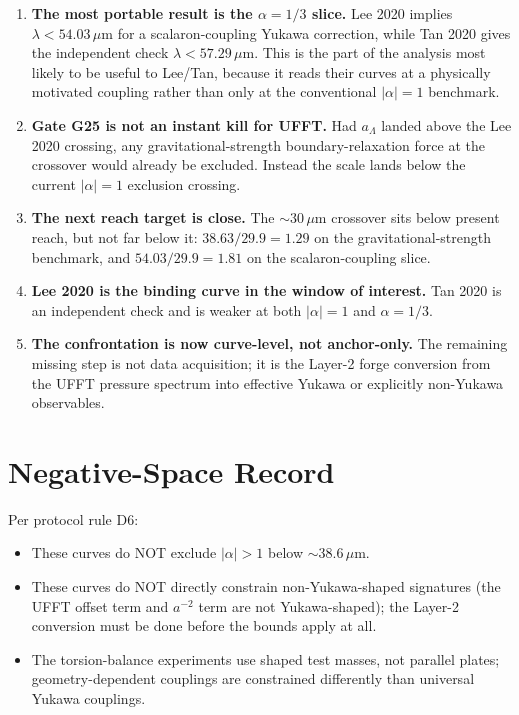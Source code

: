 \documentclass{article}
\begin{document}
\begin{enumerate}
\item \textbf{The most portable result is the $\alpha=1/3$ slice.} Lee 2020 implies
   $\lambda<54.03\,\mu$m for a scalaron-coupling Yukawa correction, while
   Tan 2020 gives the independent check $\lambda<57.29\,\mu$m. This is the
   part of the analysis most likely to be useful to Lee/Tan, because it reads
   their curves at a physically motivated coupling rather than only at the
   conventional $|\alpha|=1$ benchmark.

\item \textbf{Gate G25 is not an instant kill for UFFT.} Had $a_\Lambda$ landed above
   the Lee 2020 crossing, any gravitational-strength boundary-relaxation
   force at the crossover would already be excluded. Instead the scale lands
   below the current $|\alpha|=1$ exclusion crossing.

\item \textbf{The next reach target is close.} The $\sim30\,\mu$m crossover sits below
   present reach, but not far below it: $38.63/29.9 = 1.29$ on the
   gravitational-strength benchmark, and $54.03/29.9 = 1.81$ on the
   scalaron-coupling slice.

\item \textbf{Lee 2020 is the binding curve in the window of interest.} Tan 2020 is an
   independent check and is weaker at both $|\alpha|=1$ and $\alpha=1/3$.

\item \textbf{The confrontation is now curve-level, not anchor-only.} The remaining
   missing step is not data acquisition; it is the Layer-2 forge conversion
   from the UFFT pressure spectrum into effective Yukawa or explicitly
   non-Yukawa observables.
\end{enumerate}

\section{Negative-Space Record}

Per protocol rule D6:

\begin{itemize}
\item These curves do NOT exclude $|\alpha|>1$ below $\sim38.6\,\mu$m.
\item These curves do NOT directly constrain non-Yukawa-shaped signatures
  (the UFFT offset term and $a^{-2}$ term are not Yukawa-shaped); the
  Layer-2 conversion must be done before the bounds apply at all.
\item The torsion-balance experiments use shaped test masses, not parallel
  plates; geometry-dependent couplings are constrained differently than
  universal Yukawa couplings.
\end{itemize}
\end{document}
